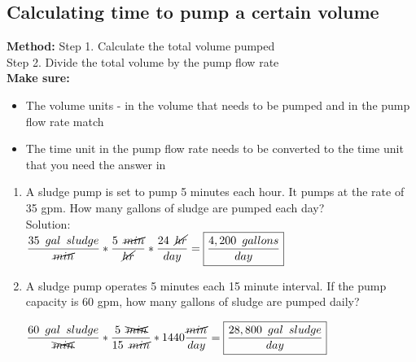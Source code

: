 \documentclass{article}
\begin{document}
\begin{enumerate}
\subsection{Calculating time to pump a certain volume}
\textbf{Method:}
\hspace{1cm}Step 1. Calculate the total volume pumped\\
\hspace{1cm}Step 2.	Divide the total volume by the pump flow rate\\
\textbf{Make sure:}
\begin{itemize}
\item The volume units - in the volume that needs to be pumped and in the pump flow rate match
\item The time unit in the pump flow rate needs to be converted to the time unit that you need the answer in
\end{itemize}



\begin{enumerate}

\item A sludge pump is set to pump 5 minutes each hour. It pumps at the rate of 35 gpm. How many gallons of sludge are pumped each day?\\
Solution:\\
$\dfrac{35 \enspace gal \enspace sludge}{\cancel{min}}*\dfrac{5 \enspace \cancel{min}}{\cancel{hr}} *\dfrac{24 \enspace \cancel{hr}}{day}=\boxed{\dfrac{4,200 \enspace gallons}{day}}$\\
\vspace{0.5cm}

\item A sludge pump operates 5 minutes each 15 minute interval.  If the pump capacity is 60 gpm, how many gallons of sludge are pumped daily?

$\dfrac{60 \enspace gal \enspace sludge}{\xcancel{min}}*\dfrac{5 \enspace \xcancel{min}}{15 \enspace \cancel{min}}*1440\dfrac{\cancel{min}}{day}=\boxed{\dfrac {28,800 \enspace gal \enspace sludge }{day}}$\\


\end{enumerate}
\end{enumerate}
\end{document}
